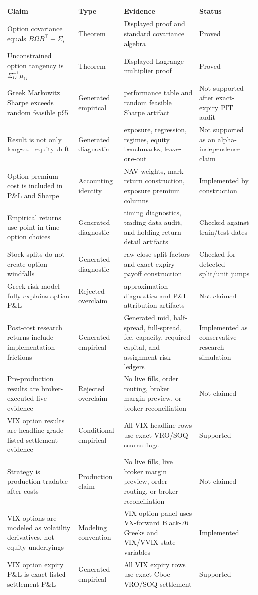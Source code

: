 \begin{tabular}{llll}
\toprule
Claim & Type & Evidence & Status \\
\midrule
Option covariance equals $B\Omega B^\top+\Sigma_\varepsilon$ & Theorem & Displayed proof and standard covariance algebra & Proved \\
Unconstrained option tangency is $\Sigma_O^{-1}\mu_O$ & Theorem & Displayed Lagrange multiplier proof & Proved \\
Greek Markowitz Sharpe exceeds random feasible p95 & Generated empirical & performance table and random feasible Sharpe artifact & Not supported after exact-expiry PIT audit \\
Result is not only long-call equity drift & Generated diagnostic & exposure, regression, regimes, equity benchmarks, leave-one-out & Not supported as an alpha-independence claim \\
Option premium cost is included in P\&L and Sharpe & Accounting identity & NAV weights, mark-return construction, exposure premium columns & Implemented by construction \\
Empirical returns use point-in-time option choices & Generated diagnostic & timing diagnostics, trading-data audit, and holding-return detail artifacts & Checked against train/test dates \\
Stock splits do not create option windfalls & Generated diagnostic & raw-close split factors and exact-expiry payoff construction & Checked for detected split/unit jumps \\
Greek risk model fully explains option P\&L & Rejected overclaim & approximation diagnostics and P\&L attribution artifacts & Not claimed \\
Post-cost research returns include implementation frictions & Generated empirical & Generated mid, half-spread, full-spread, fee, capacity, required-capital, and assignment-risk ledgers & Implemented as conservative research simulation \\
Pre-production results are broker-executed live evidence & Rejected overclaim & No live fills, order routing, broker margin preview, or broker reconciliation & Not claimed \\
VIX option results are headline-grade listed-settlement evidence & Conditional empirical & All VIX headline rows use exact VRO/SOQ source flags & Supported \\
Strategy is production tradable after costs & Production claim & No live fills, live broker margin preview, order routing, or broker reconciliation & Not claimed \\
VIX options are modeled as volatility derivatives, not equity underlyings & Modeling convention & VIX option panel uses VX-forward Black-76 Greeks and VIX/VVIX state variables & Implemented \\
VIX option expiry P\&L is exact listed settlement P\&L & Generated empirical & All VIX expiry rows use exact Cboe VRO/SOQ settlement & Supported \\
\bottomrule
\end{tabular}
